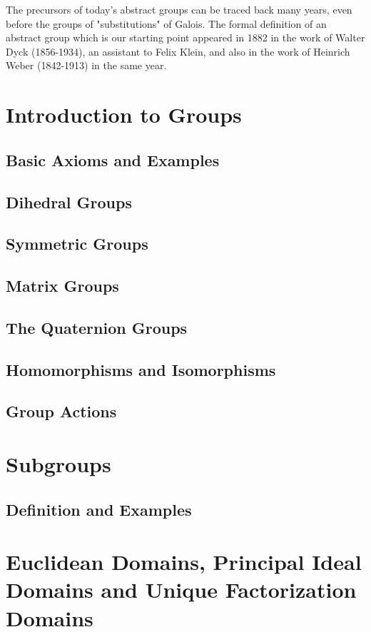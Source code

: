 \documentclass[cn,11pt,chinese]{elegantbook}
\numberwithin{equation}{section}
\begin{document}
The precursors of today's abstract groups can be traced back many years, even before the groups of "substitutions" of Galois. The formal definition of an abstract group which is our starting point appeared in 1882 in the work of Walter Dyck (1856-1934), an assistant to Felix Klein, and also in the work of Heinrich Weber (1842-1913) in the same year.



\chapter{Introduction to Groups}\label{chapter001}
\section{Basic Axioms and Examples}\label{section00101}


\section{Dihedral Groups}\label{section00102}



\section{Symmetric Groups}\label{section00103}



\section{Matrix Groups}\label{section00104}



\section{The Quaternion Groups}\label{section00105}



\section{Homomorphisms and Isomorphisms}\label{section00106}



\section{Group Actions}\label{section00107}




\chapter{Subgroups}\label{chapter002}
\section{Definition and Examples}\label{section00201}


\chapter{Euclidean Domains, Principal Ideal Domains and Unique Factorization Domains}\label{chapter008}





% 

\appendix
\end{document}
